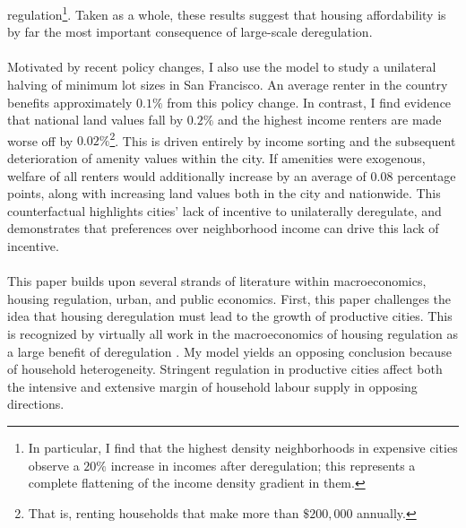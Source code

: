 \documentclass[12pt]{article}
\begin{document}
regulation\footnote{In particular, I find that the highest density neighborhoods in expensive cities observe a $20 \%$ increase in incomes after deregulation; this represents a complete flattening of the income density gradient in them.}. Taken as a whole, these results suggest that housing affordability is by far the most important consequence of large-scale deregulation. 
	
	\paragraph*{}
	Motivated by recent policy changes, I also use the model to study a unilateral halving of minimum lot sizes in San Francisco. An average renter in the country benefits approximately $0.1 \%$ from this policy change. In contrast, I find evidence that national land values fall by $0.2\%$ and the highest income renters are made worse off by $0.02\%$\footnote{That is, renting households that make more than $\$200,000$ annually.}. This is driven entirely by income sorting and the subsequent deterioration of amenity values within the city. If amenities were exogenous, welfare of all renters would additionally increase by an average of $0.08$ percentage points, along with increasing land values both in the city and nationwide. This counterfactual highlights cities' lack of incentive to unilaterally deregulate, and demonstrates that preferences over neighborhood income can drive this lack of incentive.
	
	\paragraph*{}
	This paper builds upon several strands of literature within  macroeconomics, housing regulation, urban, and public economics. First, this paper challenges the idea that housing deregulation must lead to the growth of productive cities. This is recognized by virtually all work in the macroeconomics of housing regulation as a large benefit of deregulation \citep{hseihmoretti, durantonpugaurbgrowth, parkho, hop, bunten}. My model yields an opposing conclusion because of household heterogeneity. Stringent regulation in productive cities affect both the intensive and extensive margin of household labour supply in opposing directions. 
	
\end{document}

